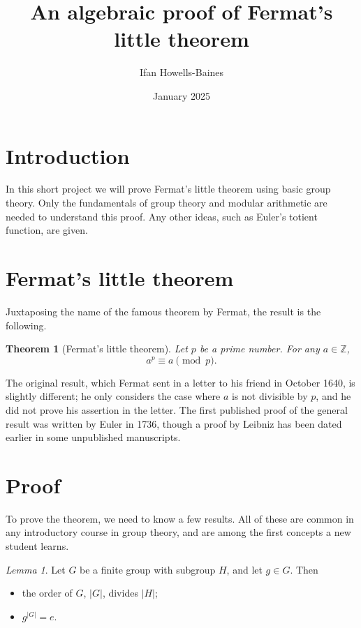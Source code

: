 \documentclass[12pt]{article}
\title{An algebraic proof of Fermat's little theorem}
\author{Ifan Howells-Baines}
\date{January 2025}
\theoremstyle{theorem}
\theoremstyle{theorem}
\newtheorem*{theorem*}{Theorem}
\theoremstyle{definition}
\theoremstyle{example}
\theoremstyle{remark}
\theoremstyle{propposition}
\theoremstyle{lemma}
\newtheorem*{lemma*}{Lemma}
\begin{document}
\maketitle

\section*{Introduction}
\label{sec:intro}

In this short project we will prove Fermat's little theorem using basic group theory. Only the fundamentals of group theory and modular arithmetic are needed to understand this proof. Any other ideas, such as Euler's totient function, are given.

\section*{Fermat's little theorem}
\label{sec:flt}

Juxtaposing the name of the famous theorem by Fermat, the result is the following.

\begin{theorem*}[Fermat's little theorem]
  \label{thm:flt}
  Let $p$ be a prime number. For any $a\in\mathbb{Z}$, $$a^p\equiv a\pmod p.$$
\end{theorem*}

The original result, which Fermat sent in a letter to his friend in October 1640, is slightly different; he only considers the case where $a$ is not divisible by $p$, and he did not prove his assertion in the letter. The first published proof of the general result was written by Euler in 1736, though a proof by Leibniz has been dated earlier in some unpublished manuscripts.

\section*{Proof}
\label{sec:proof}

To prove the theorem, we need to know a few results. All of these are common in any introductory course in group theory, and are among the first concepts a new student learns.

\begin{lemma*}
  Let $G$ be a finite group with subgroup $H$, and let $g\in G$. Then
  \begin{itemize}
  \item the order of $G$, $|G|$, divides $|H|$;
  \item $g^{|G|}=e$.
  \end{itemize}
\end{lemma*}
\end{document}
